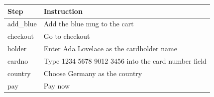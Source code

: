 \begin{tabular}{@{}lp{11cm}@{}}
\toprule
Step & Instruction \\
\midrule
add\_blue & Add the blue mug to the cart \\
checkout & Go to checkout \\
holder & Enter \textquotesingle{}Ada Lovelace\textquotesingle{} as the cardholder name \\
cardno & Type \textquotesingle{}1234 5678 9012 3456\textquotesingle{} into the card number field \\
country & Choose Germany as the country \\
pay & Pay now \\
\bottomrule
\end{tabular}

